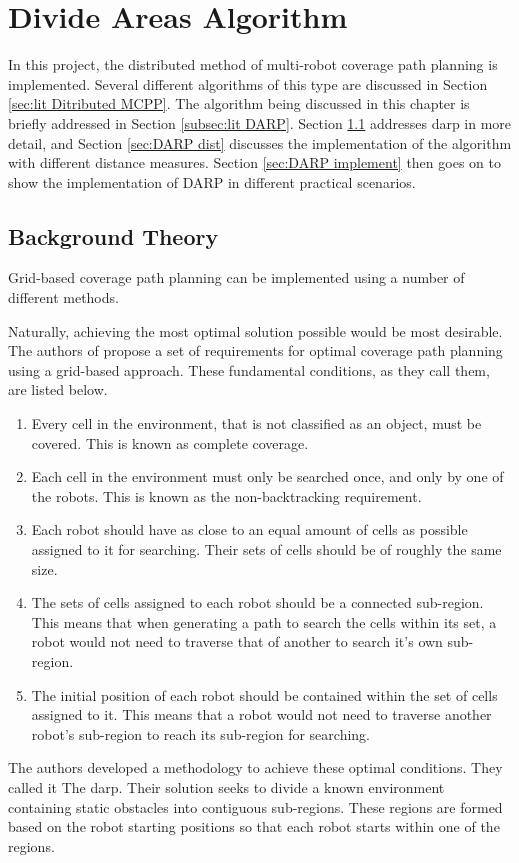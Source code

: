 \chapter{Divide Areas Algorithm}
\label{chp:DARP}
In this project, the distributed method of multi-robot coverage path planning is implemented. Several different algorithms of this type are discussed in Section \ref{sec:lit Ditributed MCPP}. The algorithm being discussed in this chapter is briefly addressed in Section \ref{subsec:lit DARP}. Section \ref{sec:DARP bg} addresses \ac{darp} in more detail, and Section \ref{sec:DARP dist} discusses the implementation of the algorithm with different distance measures. Section \ref{sec:DARP implement} then goes on to show the implementation of DARP in different practical scenarios. 
\section{Background Theory}
\label{sec:DARP bg}
Grid-based coverage path planning can be implemented using a number of different methods. %

Naturally, achieving the most optimal solution possible would be most desirable. The authors of \cite{DARP2017} propose a set of requirements for optimal coverage path planning using a grid-based approach. These fundamental conditions, as they call them, are listed below.
\begin{enumerate}
	\item Every cell in the environment, that is not classified as an object, must be covered. This is known as complete coverage.
	\item Each cell in the environment must only be searched once, and only by one of the robots. This is known as the non-backtracking requirement.
	\item Each robot should have as close to an equal amount of cells as possible assigned to it for searching. Their sets of cells should be of roughly the same size.
	\item The sets of cells assigned to each robot should be a connected sub-region. This means that when generating a path to search the cells within its set, a robot would not need to traverse that of another to search it's own sub-region.
	\item The initial position of each robot should be contained within the set of cells assigned to it. This means that a robot would not need to traverse another robot's sub-region to reach its sub-region for searching.
\end{enumerate}
The authors developed a methodology to achieve these optimal conditions. They called it The \ac{darp}. Their solution seeks to divide a known environment containing static obstacles into contiguous sub-regions. These regions are formed based on the robot starting positions so that each robot starts within one of the regions.


